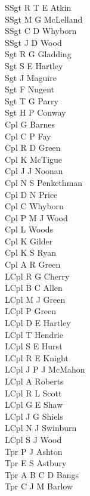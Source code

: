 \begin{multicols}{4}
  \scriptsize
  \noindent
  SSgt R T E Atkin \\
  SSgt M G McLelland \\
  SSgt C D Whyborn \\
  SSgt J D Wood \\
  Sgt R G Gladding \\
  Sgt S E Hartley \\
  Sgt J Maguire \\
  Sgt F Nugent \\
  Sgt T G Parry \\
  Sgt H P Conway \\
  Cpl G Barnes \\
  Cpl C P Fay \\
  Cpl R D Green \\
  Cpl K McTigue \\
  Cpl J J Noonan \\
  Cpl N S Penkethman \\
  Cpl D N Price \\
  Cpl C Whyborn \\
  Cpl P M J Wood \\
  Cpl L Woods \\
  Cpl K Gilder \\
  Cpl K S Ryan \\
  Cpl A R Green \\
  LCpl R G Cherry \\
  LCpl B C Allen \\
  LCpl M J Green \\
  LCpl P Green \\
  LCpl D E Hartley \\
  LCpl T Hendrie \\
  LCpl S E Hurst \\
  LCpl R E Knight \\
  LCpl J P J McMahon \\
  LCpl A Roberts \\
  LCpl R L Scott \\
  LCpl G E Shaw \\
  LCpl J G Shiels \\
  LCpl N J Swinburn \\
  LCpl S J Wood \\
  Tpr P J Ashton \\
  Tpr E S Astbury \\
  Tpr A B C D Bangs \\
  Tpr C J M Barlow \\

\end{multicols}
